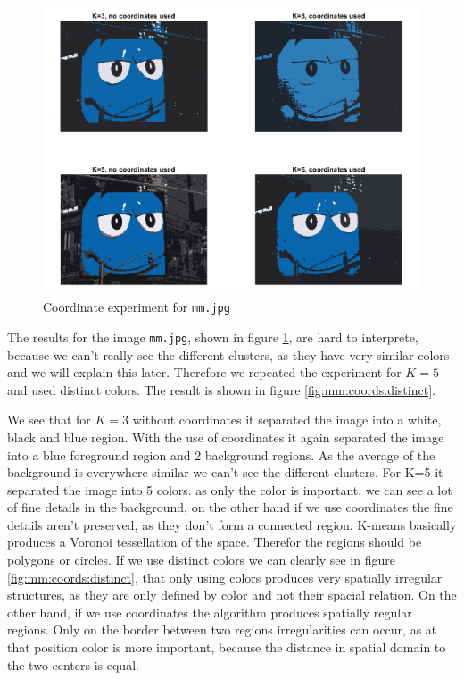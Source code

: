 \begin{figure}[h!]
\centering
\includegraphics[width = 0.8\linewidth]{figures/task2/mm_coordinates.png}
\caption{Coordinate experiment for \texttt{mm.jpg}}
\label{fig:mm:coords}
\end{figure}

The results for the image \texttt{mm.jpg}, shown in figure \ref{fig:mm:coords}, are hard to interprete, because we can't really see the different clusters, as they have very similar colors and we will explain this later. Therefore we repeated the experiment for $K=5$ and used distinct colors. The result is shown in figure \ref{fig:mm:coords:distinct}. 

We see that for $K=3$ without coordinates it separated the image into a white, black and blue region. With the use of coordinates it again separated the image into a blue foreground region and 2 background regions. As the average of the background is everywhere similar we can't see the different clusters. For K=5 it separated the image into 5 colors. as only the color is important, we can see a lot of fine details in the background, on the other hand if we use coordinates the fine details aren't preserved, as they don't form a connected region. K-means basically produces a Voronoi tessellation of the space. Therefor the regions should be polygons or circles. If we use distinct colors we can clearly see in figure \ref{fig:mm:coords:distinct}, that only using colors produces very spatially irregular structures, as they are only defined by color and not their spacial relation. On the other hand, if we use coordinates the algorithm produces spatially regular regions. Only on the border between two regions irregularities can occur, as at that position color is more important, because the distance in spatial domain to the two centers is equal.

